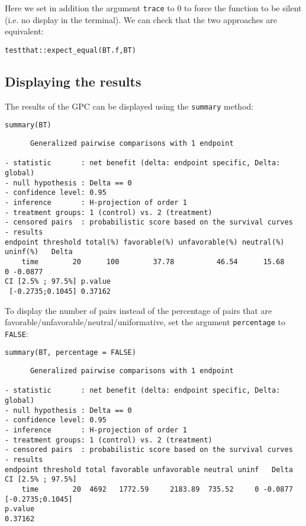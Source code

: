 \documentclass[12pt]{article}
\begin{document}
Here we set in addition the argument \texttt{trace} to 0 to force the
function to be silent (i.e. no display in the terminal). We can check
that the two approaches are equivalent:
\lstset{language=r,label= ,caption= ,captionpos=b,numbers=none}
\begin{lstlisting}
testthat::expect_equal(BT.f,BT)
\end{lstlisting}

\subsection{Displaying the results}
\label{sec:org5b4bad1}

The results of the GPC can be displayed using the \texttt{summary} method:
\lstset{language=r,label= ,caption= ,captionpos=b,numbers=none}
\begin{lstlisting}
summary(BT)
\end{lstlisting}

\begin{verbatim}
      Generalized pairwise comparisons with 1 endpoint

- statistic       : net benefit (delta: endpoint specific, Delta: global) 
- null hypothesis : Delta == 0 
- confidence level: 0.95 
- inference       : H-projection of order 1
- treatment groups: 1 (control) vs. 2 (treatment) 
- censored pairs  : probabilistic score based on the survival curves
- results
endpoint threshold total(%) favorable(%) unfavorable(%) neutral(%) uninf(%)   Delta
    time        20      100        37.78          46.54      15.68        0 -0.0877
CI [2.5% ; 97.5%] p.value 
 [-0.2735;0.1045] 0.37162
\end{verbatim}

 To display the number of pairs instead of the percentage of pairs
that are favorable/unfavorable/neutral/uniformative, set the argument
\texttt{percentage} to \texttt{FALSE}:
\lstset{language=r,label= ,caption= ,captionpos=b,numbers=none}
\begin{lstlisting}
summary(BT, percentage = FALSE)
\end{lstlisting}

\begin{verbatim}
      Generalized pairwise comparisons with 1 endpoint

- statistic       : net benefit (delta: endpoint specific, Delta: global) 
- null hypothesis : Delta == 0 
- confidence level: 0.95 
- inference       : H-projection of order 1
- treatment groups: 1 (control) vs. 2 (treatment) 
- censored pairs  : probabilistic score based on the survival curves
- results
endpoint threshold total favorable unfavorable neutral uninf   Delta CI [2.5% ; 97.5%]
    time        20  4692   1772.59     2183.89  735.52     0 -0.0877  [-0.2735;0.1045]
p.value 
0.37162
\end{verbatim}
\end{document}
